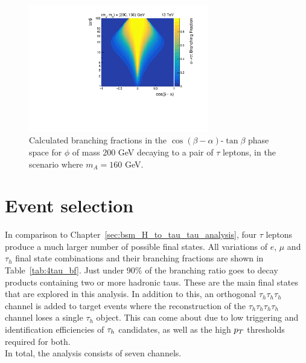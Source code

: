 \begin{figure}[!hbtp]
\centering
    \includegraphics[width=0.7\textwidth]{Figures/phi_branching_fractions_mphi200_mA160.pdf}
\caption{Calculated branching fractions in the $\cos(\beta-\alpha)$-$\tan\beta$ phase space for $\phi$ of mass 200 GeV decaying to a pair of $\tau$ leptons, in the scenario where $m_A = 160$ GeV.}
\label{fig:4tau_br_2d}
\end{figure}

\section{Event selection}

In comparison to Chapter~\ref{sec:bsm_H_to_tau_tau_analysis}, four $\tau$ leptons produce a much larger number of possible final states. 
All variations of $e$, $\mu$ and $\tau_h$ final state combinations and their branching fractions are shown in Table~\ref{tab:4tau_bf}.
Just under 90\% of the branching ratio goes to decay products containing two or more hadronic taus.
These are the main final states that are explored in this analysis. 
In addition to this, an orthogonal $\tau_h \tau_h \tau_h$ channel is added to target events where the reconstruction of the $\tau_h \tau_h \tau_h \tau_h$ channel loses a single $\tau_h$ object.
This can come about due to low triggering and identification efficiencies of $\tau_{h}$ candidates, as well as the high $p_{T}$ thresholds required for both. \\
In total, the analysis consists of seven channels.

